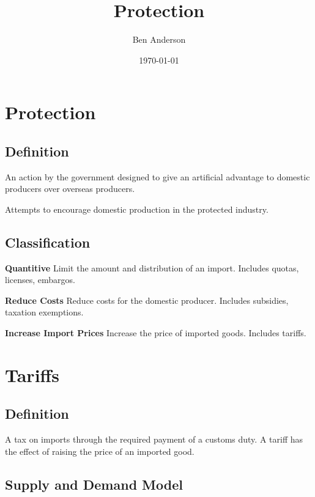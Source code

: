 \documentclass[a4paper,11pt]{article}
\begin{document}
\title{Protection}
\author{Ben Anderson}
\date{\today}
\maketitle
\pagebreak

\tableofcontents
\pagebreak


\section{Protection}

\subsection{Definition}

An action by the government designed to give an artificial advantage to
domestic producers over overseas producers.

Attempts to encourage domestic production in the protected industry.


\subsection{Classification}

\textbf{Quantitive} \quad Limit the amount and distribution of an import.
Includes quotas, licenses, embargos.

\textbf{Reduce Costs} \quad Reduce costs for the domestic producer. Includes
subsidies, taxation exemptions.

\textbf{Increase Import Prices} \quad Increase the price of imported goods.
Includes tariffs.




\section{Tariffs}

\subsection{Definition}

A tax on imports through the required payment of a customs duty. A tariff has
the effect of raising the price of an imported good.


\subsection{Supply and Demand Model}
\end{document}
